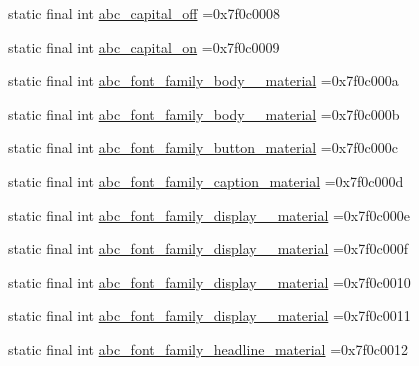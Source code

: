 \begin{DoxyCompactItemize}
\item 
static final int \mbox{\hyperlink{classbr_1_1unb_1_1cic_1_1mp_1_1marketmaster_1_1R_1_1string_a16fe1ce727c4340de026e88c02b41d9e}{abc\+\_\+capital\+\_\+off}} =0x7f0c0008
\item 
static final int \mbox{\hyperlink{classbr_1_1unb_1_1cic_1_1mp_1_1marketmaster_1_1R_1_1string_ac96717d30c9e47f4e3693dba8439a74f}{abc\+\_\+capital\+\_\+on}} =0x7f0c0009
\item 
static final int \mbox{\hyperlink{classbr_1_1unb_1_1cic_1_1mp_1_1marketmaster_1_1R_1_1string_ad1a5098136ef91f05e02bcd49cedd75a}{abc\+\_\+font\+\_\+family\+\_\+body\+\_\+\_\+material}} =0x7f0c000a
\item 
static final int \mbox{\hyperlink{classbr_1_1unb_1_1cic_1_1mp_1_1marketmaster_1_1R_1_1string_a2b1f567a2da41d90302a1a59adb92963}{abc\+\_\+font\+\_\+family\+\_\+body\+\_\+\_\+material}} =0x7f0c000b
\item 
static final int \mbox{\hyperlink{classbr_1_1unb_1_1cic_1_1mp_1_1marketmaster_1_1R_1_1string_a2ad124e0149fef435259e83627a4ad9d}{abc\+\_\+font\+\_\+family\+\_\+button\+\_\+material}} =0x7f0c000c
\item 
static final int \mbox{\hyperlink{classbr_1_1unb_1_1cic_1_1mp_1_1marketmaster_1_1R_1_1string_ab0011ebec866e10ce5cd781d455d5323}{abc\+\_\+font\+\_\+family\+\_\+caption\+\_\+material}} =0x7f0c000d
\item 
static final int \mbox{\hyperlink{classbr_1_1unb_1_1cic_1_1mp_1_1marketmaster_1_1R_1_1string_a273e7abd6fbd4bfbe45cb9e86b939ce2}{abc\+\_\+font\+\_\+family\+\_\+display\+\_\+\_\+material}} =0x7f0c000e
\item 
static final int \mbox{\hyperlink{classbr_1_1unb_1_1cic_1_1mp_1_1marketmaster_1_1R_1_1string_a2f04aecd3d1d4ef10111f21903119a97}{abc\+\_\+font\+\_\+family\+\_\+display\+\_\+\_\+material}} =0x7f0c000f
\item 
static final int \mbox{\hyperlink{classbr_1_1unb_1_1cic_1_1mp_1_1marketmaster_1_1R_1_1string_a8ee3f818028a6dfd96041462eb090a6f}{abc\+\_\+font\+\_\+family\+\_\+display\+\_\+\_\+material}} =0x7f0c0010
\item 
static final int \mbox{\hyperlink{classbr_1_1unb_1_1cic_1_1mp_1_1marketmaster_1_1R_1_1string_a0439364f7041f2789e3ef9f008b144e2}{abc\+\_\+font\+\_\+family\+\_\+display\+\_\+\_\+material}} =0x7f0c0011
\item 
static final int \mbox{\hyperlink{classbr_1_1unb_1_1cic_1_1mp_1_1marketmaster_1_1R_1_1string_aebba8eb51797596b32467b8a08d55bfc}{abc\+\_\+font\+\_\+family\+\_\+headline\+\_\+material}} =0x7f0c0012

\end{DoxyCompactItemize}
